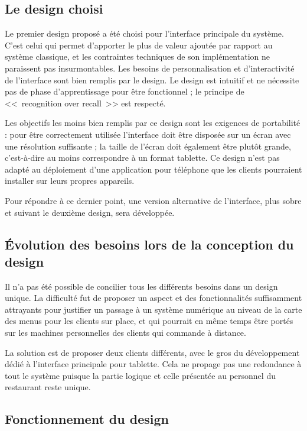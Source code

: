 \documentclass[a4paper,12pt]{article}
\begin{document}
\subsection{Le design choisi}

Le premier design proposé a été choisi pour l'interface principale du système. C'est celui qui permet d'apporter
le plus de valeur ajoutée par rapport au système classique, et les contraintes techniques de son implémentation
ne paraissent pas insurmontables. Les besoins de personnalisation et d'interactivité de l'interface sont bien remplis
par le design. Le design est intuitif et ne nécessite pas de phase d'apprentissage pour être fonctionnel ; le 
principe de <<~recognition over recall~>> est respecté.

Les objectifs les moins bien remplis par ce design sont les exigences de portabilité : pour être correctement utilisée
l'interface doit être disposée sur un écran avec une résolution suffisante ; la taille de l'écran doit également
être plutôt grande, c'est-à-dire au moins correspondre à un format tablette. Ce design n'est pas adapté au déploiement
d'une application pour téléphone que les clients pourraient installer sur leurs propres appareils.

Pour répondre à ce dernier point, une version alternative de l'interface, plus sobre et suivant le deuxième design,
sera développée.

\subsection{Évolution des besoins lors de la conception du design}

Il n'a pas été possible de concilier tous les différents besoins dans un design unique. La difficulté fut de proposer
un aspect et des fonctionnalités suffisamment attrayants pour justifier un passage à un système numérique au niveau
de la carte des menus pour les clients sur place, et qui pourrait en même temps être portés sur les machines
personnelles des clients qui commande à distance.

La solution est de proposer deux clients différents, avec le gros du développement dédié à l'interface principale
pour tablette. Cela ne propage pas une redondance à tout le système puisque la partie logique et celle présentée
au personnel du restaurant reste unique.

\subsection{Fonctionnement du design}
\end{document}
